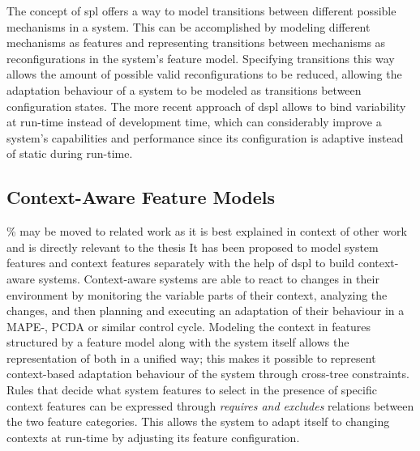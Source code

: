 The concept of \Gls{spl} offers a way to model transitions between different possible mechanisms in a system. This can be accomplished by modeling different mechanisms as features and representing transitions between mechanisms as reconfigurations in the system's feature model. Specifying transitions this way allows the amount of possible valid reconfigurations to be reduced, allowing the adaptation behaviour of a system to be modeled as transitions between configuration states.
The more recent approach of \Gls{dspl} \cite{} allows to bind variability at run-time instead of development time, which can considerably improve a system's capabilities and performance since its configuration is adaptive instead of static during run-time. 

\subsection{Context-Aware Feature Models} 
\% may be moved to related work as it is best explained in context of other work and is directly relevant to the thesis
It has been proposed \cite{Acher2009} \cite{Saller2013} \cite{Fernandes2008} to model system features and context features separately with the help of \Gls{dspl} to build context-aware systems. Context-aware systems are able to react to changes in their environment by monitoring the variable parts of their context, analyzing the changes, and then planning and executing an adaptation of their behaviour in a MAPE-, PCDA or similar control cycle. 
Modeling the context in features structured by a feature model along with the system itself allows the representation of both in a unified way; this makes it possible to represent context-based adaptation behaviour of the system through cross-tree constraints. Rules that decide what system features to select in the presence of specific context features can be expressed through \textit{requires and excludes} relations between the two feature categories. This allows the system to adapt itself to changing contexts at run-time by adjusting its feature configuration.


